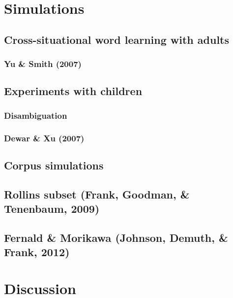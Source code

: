 \documentclass[man,noapacite]{apa2}
\begin{document}
\section{Simulations}

\subsection{Cross-situational word learning with adults}

\subsubsection{Yu \& Smith (2007)}

\subsection{Experiments with children}

\subsubsection{Disambiguation}

\subsubsection{Dewar \& Xu (2007)}


\subsection{Corpus simulations}

\subsection{Rollins subset (Frank, Goodman, \& Tenenbaum, 2009)}

\subsection{Fernald \& Morikawa (Johnson, Demuth, \& Frank, 2012)}

\section{Discussion}

\newpage



\end{document}
